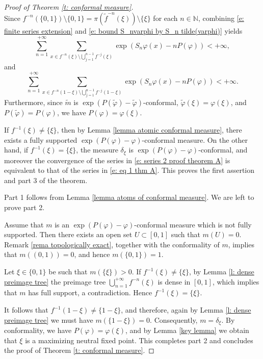 \documentclass[10pt,a4paper]{amsart}
\numberwithin{equation}{section} %
\numberwithin{figure}{section} %
\newcommand{\N}{\mathbb{N}}
\renewcommand{\=}{\coloneqq}
\begin{document}
\begin{proof}[Proof of Theorem \ref{t: conformal measure}]
\begin{equation}
\end{equation}
Since $f^{-n}(\{0,1\})\setminus\{0,1\} = \pi(\widetilde{f}^{-n}(\xi))\setminus\{\xi\}$ for each $n\in \N$,
combining \eqref{e: finite series extension} and \eqref{e: bound S_nvarphi by S_n tilde(varphi)} yields
\begin{equation*}
     \sum_{n=1}^{+\infty}\sum_{x\in f^{-n}(\xi)\setminus\bigcup_{j=1}^{n-1}f^{-j}(\xi)} \exp(S_n\varphi(x) - nP(\varphi)) <+\infty,
\end{equation*}
and
\begin{equation}\label{e: series 2 proof theorem A}
     \sum_{n=1}^{+\infty}\sum_{x\in f^{-n}(1-\xi)\setminus\bigcup_{j=1}^{n-1}f^{-j}(1-\xi)} \exp(S_n\varphi(x) - nP(\varphi)) <+\infty.
\end{equation}
Furthermore, since $\widetilde{m}$ is $\exp(P(\widetilde\varphi)-\widetilde{\varphi})$-conformal, $\widetilde{\varphi}(\xi)=\varphi(\xi)$, and $P(\widetilde\varphi) = P(\varphi)$, we have $P(\varphi)= \varphi(\xi)$.

If $f^{-1}(\xi)\neq \{\xi\}$, then by Lemma \ref{lemma atomic conformal measure}, there exists a fully supported $\exp(P(\varphi)- \varphi)$-conformal measure. On the other hand, if $f^{-1}(\xi)=\{\xi\}$, the measure $\delta_{\xi}$ is $\exp(P(\varphi)-\varphi)$-conformal, and moreover the convergence of the series in \eqref{e: series 2 proof theorem A} is equivalent to that of the series in \eqref{e: eq 1 thm A}. This proves the first assertion and part 3 of the theorem.

Part 1 follows from Lemma \ref{lemma atoms of conformal measure}. We are left to prove part 2.

Assume that $m$ is an $\exp(P(\varphi)-\varphi)$-conformal measure which is not fully supported. Then there exists an open set $U\subset [0,1]$ such that $m(U)=0$. Remark \ref{rema topologically exact}, together with the conformality of $m$, implies that $m((0,1))=0$, and hence $m(\{0,1\})=1$.

Let $\xi \in \{0,1\}$ be such that $m(\{\xi\})>0$. If $f^{-1}(\xi) \neq \{\xi\}$, by Lemma \ref{l: dense preimage tree} the preimage tree $\bigcup_{n=1}^{+\infty} f^{-n}(\xi)$ is dense in $[0,1]$, which implies that $m$ has full support, a contradiction. Hence $f^{-1}(\xi)=\{\xi\}$.

It follows that $f^{-1}(1-\xi) \neq \{1-\xi\}$, and therefore, again by Lemma \ref{l: dense preimage tree} we must have $m(\{1-\xi\})=0$. Consequently, $m=\delta_{\xi}$. By conformality, we have $P(\varphi)= \varphi(\xi)$, and by Lemma \ref{key lemma} we obtain that $\xi$ is a maximizing neutral fixed point. This completes part 2 and concludes the proof of Theorem \ref{t: conformal measure}.
\end{proof}
\end{document}
